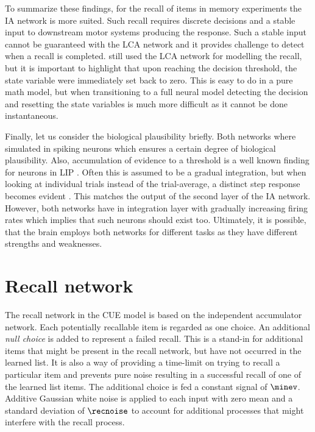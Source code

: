 To summarize these findings, for the recall of items in memory experiments the IA network is more suited.
Such recall requires discrete decisions and a stable input to downstream motor systems producing the response.
Such a stable input cannot be guaranteed with the LCA network and it provides challenge to detect when a recall is completed.
\Textcite{Sederberg2008} still used the LCA network for modelling the recall, but it is important to highlight that upon reaching the decision threshold, the state variable were immediately set back to zero.
This is easy to do in a pure math model, but when transitioning to a full neural model detecting the decision and resetting the state variables is much more difficult as it cannot be done instantaneous.

Finally, let us consider the biological plausibility briefly.
Both networks where simulated in spiking neurons which ensures a certain degree of biological plausibility.
Also, accumulation of evidence to a threshold is a well known finding for neurons in LIP \parencite{gold2007,smith2004}.
Often this is assumed to be a gradual integration, but when looking at individual trials instead of the trial-average, a distinct step response becomes evident \parencite{latimer2015}.
This matches the output of the second layer of the IA network.
However, both networks have in integration layer with gradually increasing firing rates which implies that such neurons should exist too.
Ultimately, it is possible, that the brain employs both networks for different tasks as they have different strengths and weaknesses.


\section{Recall network}\label{sec:recall-net}
The recall network in the CUE model is based on the independent accumulator network.
Each potentially recallable item is regarded as one choice.
An additional \emph{null choice} is added to represent a failed recall.
This is a stand-in for additional items that might be present in the recall network, but have not occurred in the learned list.
It is also a way of providing a time-limit on trying to recall a particular item and prevents pure noise resulting in a successful recall of one of the learned list items.
The additional choice is fed a constant signal of $\minev$.
Additive Gaussian white noise is applied to each input with zero mean and a standard deviation of $\recnoise$ to account for additional processes that might interfere with the recall process.

